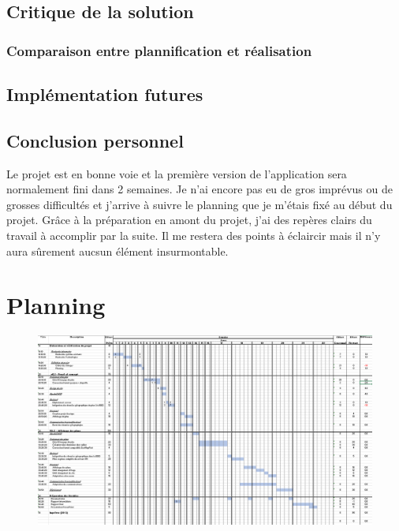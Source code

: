 \documentclass[
    iai, %
    il, %
]{heig-tb}
\begin{document}
\section{Critique de la solution}

\subsection{Comparaison entre plannification et réalisation}

\section{Implémentation futures}

\section{Conclusion personnel}


Le projet est en bonne voie et la première version de l'application sera normalement fini dans 2 semaines.
Je n'ai encore pas eu de gros imprévus ou de grosses difficultés et j'arrive à suivre le planning que je m'étais fixé au début du projet.
Grâce à la préparation en amont du projet, j'ai des repères clairs du travail à accomplir par la suite.
Il me restera des points à éclaircir mais il n'y aura sûrement aucsun élément insurmontable.

\vfil
\hspace{8cm}\makeatletter\@author\makeatother\par
\hspace{8cm}\begin{minipage}{5cm}
    \printsignature
\end{minipage}
\clearpage

\appendix
\appendixpage
\addappheadtotoc

\chapter{Planning}

\begin{figure}[H]
    \centering
    \includegraphics[scale=0.6, angle=90]{planning.png}
\end{figure}

\let\cleardoublepage\clearpage
\backmatter

\label{glossaire}
\printnoidxglossary
\printbibliography
\label{index}
\printindex
\end{document}
